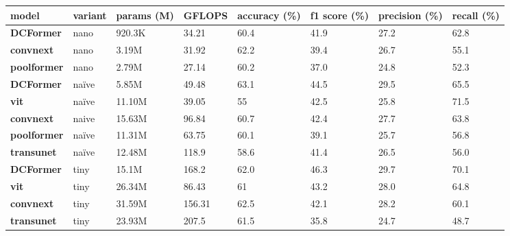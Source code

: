 \begin{table*}[t]
\scriptsize
\renewcommand\arraystretch{1.4}
\begin{center}
\begin{tabular}{|l|l|l|l|l|l|l|l|}
    \hline
        \textbf{model} & \textbf{variant} & \textbf{params (M)} & \textbf{GFLOPS} & \textbf{accuracy (\%)} & \textbf{f1 score (\%)} & \textbf{precision (\%)} & \textbf{recall (\%)} \\ \hline
        \textbf{DCFormer} & nano & 920.3K & 34.21 & 60.4 & 41.9 & 27.2 & 62.8 \\ \hline
        \textbf{convnext \cite{liu2022convnet}} & nano & 3.19M & 31.92 & 62.2 & 39.4 & 26.7 & 55.1 \\ \hline
        \textbf{poolformer \cite{yu2022metaformer}} & nano & 2.79M & 27.14 & 60.2 & 37.0 & 24.8 & 52.3 \\ \hline
        \textbf{DCFormer} & naïve & 5.85M & 49.48 & 63.1 & 44.5 & 29.5 & 65.5 \\ \hline
        \textbf{vit \cite{dosovitskiy2020image}} & naïve & 11.10M & 39.05 & 55 & 42.5 & 25.8 & 71.5 \\ \hline
        \textbf{convnext \cite{liu2022convnet}} & naive & 15.63M & 96.84 & 60.7 & 42.4 & 27.7 & 63.8 \\ \hline        
        \textbf{poolformer \cite{yu2022metaformer}} & naïve & 11.31M & 63.75 & 60.1 & 39.1 & 25.7 & 56.8 \\ \hline
        \textbf{transunet \cite{chen2021transunet}} & naïve & 12.48M & 118.9 & 58.6 & 41.4 & 26.5 & 56.0 \\ \hline
        \textbf{DCFormer} & tiny & 15.1M & 168.2 & 62.0 & 46.3 & 29.7 & 70.1 \\ \hline
        \textbf{vit \cite{dosovitskiy2020image}} & tiny & 26.34M & 86.43 & 61 & 43.2 & 28.0 & 64.8 \\ \hline
        \textbf{convnext \cite{liu2022convnet}} & tiny & 31.59M & 156.31 & 62.5 & 42.1 & 28.2 & 60.1 \\ \hline
        \textbf{transunet \cite{chen2021transunet}} & tiny & 23.93M & 207.5 & 61.5 & 35.8 & 24.7 & 48.7 \\ \hline

\end{tabular}
\end{center}
\end{table*}
